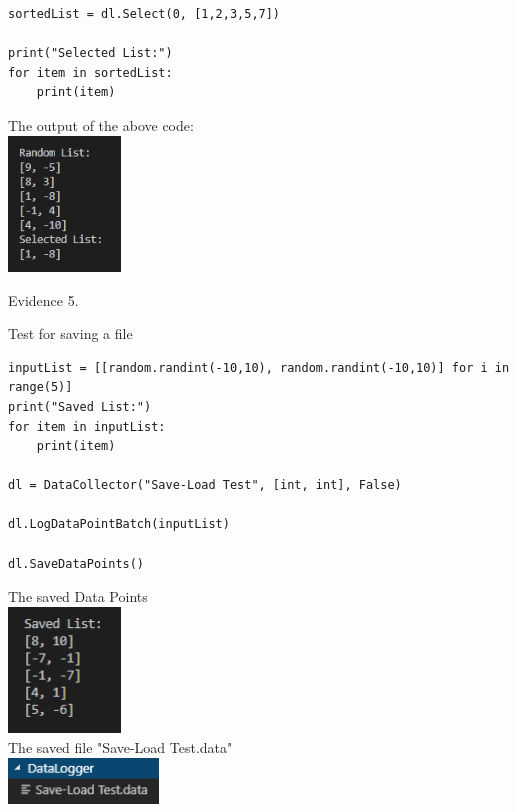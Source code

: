 \begin{flushleft}
\begin{center}
\begin{verbatim}
sortedList = dl.Select(0, [1,2,3,5,7])

print("Selected List:")
for item in sortedList:
    print(item)
        \end{verbatim}
            
        The output of the above code: \\
        \includegraphics[width=3cm]{Images/Testing/T4.7.1.PNG} \\
        \vspace{1cm}

        {\large Evidence 5.\rn } \\ 
        \vspace{0.3cm}

        Test for saving a file \\
        \begin{verbatim}
inputList = [[random.randint(-10,10), random.randint(-10,10)] for i in range(5)]
print("Saved List:")
for item in inputList:
    print(item)

dl = DataCollector("Save-Load Test", [int, int], False)

dl.LogDataPointBatch(inputList)

dl.SaveDataPoints()
        \end{verbatim}

        The saved Data Points \\
        \includegraphics[width=3cm]{Images/Testing/T4.8.1.PNG} \\
        The saved file "Save-Load Test.data" \\
        \includegraphics[width=4cm]{Images/Testing/T4.8.2.PNG} \\
        \vspace{1cm}


\end{center}
\end{flushleft}
